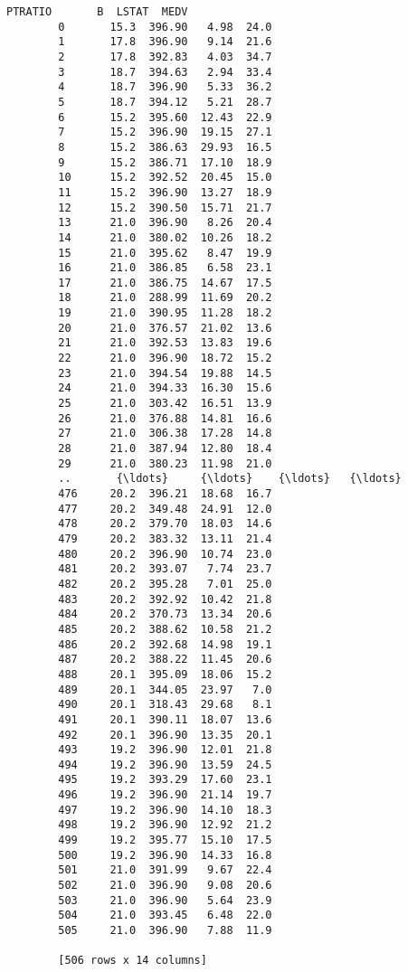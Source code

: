 \documentclass[11pt]{article}
\begin{document}
\begin{Verbatim}[commandchars=\\\{\}]
             PTRATIO       B  LSTAT  MEDV  
        0       15.3  396.90   4.98  24.0  
        1       17.8  396.90   9.14  21.6  
        2       17.8  392.83   4.03  34.7  
        3       18.7  394.63   2.94  33.4  
        4       18.7  396.90   5.33  36.2  
        5       18.7  394.12   5.21  28.7  
        6       15.2  395.60  12.43  22.9  
        7       15.2  396.90  19.15  27.1  
        8       15.2  386.63  29.93  16.5  
        9       15.2  386.71  17.10  18.9  
        10      15.2  392.52  20.45  15.0  
        11      15.2  396.90  13.27  18.9  
        12      15.2  390.50  15.71  21.7  
        13      21.0  396.90   8.26  20.4  
        14      21.0  380.02  10.26  18.2  
        15      21.0  395.62   8.47  19.9  
        16      21.0  386.85   6.58  23.1  
        17      21.0  386.75  14.67  17.5  
        18      21.0  288.99  11.69  20.2  
        19      21.0  390.95  11.28  18.2  
        20      21.0  376.57  21.02  13.6  
        21      21.0  392.53  13.83  19.6  
        22      21.0  396.90  18.72  15.2  
        23      21.0  394.54  19.88  14.5  
        24      21.0  394.33  16.30  15.6  
        25      21.0  303.42  16.51  13.9  
        26      21.0  376.88  14.81  16.6  
        27      21.0  306.38  17.28  14.8  
        28      21.0  387.94  12.80  18.4  
        29      21.0  380.23  11.98  21.0  
        ..       {\ldots}     {\ldots}    {\ldots}   {\ldots}  
        476     20.2  396.21  18.68  16.7  
        477     20.2  349.48  24.91  12.0  
        478     20.2  379.70  18.03  14.6  
        479     20.2  383.32  13.11  21.4  
        480     20.2  396.90  10.74  23.0  
        481     20.2  393.07   7.74  23.7  
        482     20.2  395.28   7.01  25.0  
        483     20.2  392.92  10.42  21.8  
        484     20.2  370.73  13.34  20.6  
        485     20.2  388.62  10.58  21.2  
        486     20.2  392.68  14.98  19.1  
        487     20.2  388.22  11.45  20.6  
        488     20.1  395.09  18.06  15.2  
        489     20.1  344.05  23.97   7.0  
        490     20.1  318.43  29.68   8.1  
        491     20.1  390.11  18.07  13.6  
        492     20.1  396.90  13.35  20.1  
        493     19.2  396.90  12.01  21.8  
        494     19.2  396.90  13.59  24.5  
        495     19.2  393.29  17.60  23.1  
        496     19.2  396.90  21.14  19.7  
        497     19.2  396.90  14.10  18.3  
        498     19.2  396.90  12.92  21.2  
        499     19.2  395.77  15.10  17.5  
        500     19.2  396.90  14.33  16.8  
        501     21.0  391.99   9.67  22.4  
        502     21.0  396.90   9.08  20.6  
        503     21.0  396.90   5.64  23.9  
        504     21.0  393.45   6.48  22.0  
        505     21.0  396.90   7.88  11.9  
        
        [506 rows x 14 columns]
\end{Verbatim}
            
\end{document}
